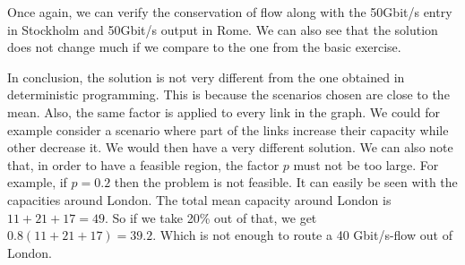 Once again, we can verify the conservation of flow along with the 50Gbit/s entry in Stockholm and 50Gbit/s output in Rome. We can also see that the solution does not change much if we compare to the one from the basic exercise. 

In conclusion, the solution is not very different from the one obtained in deterministic programming. This is because the scenarios chosen are close to the mean. Also, the same factor is applied to every link in the graph. We could for example consider a scenario where part of the links increase their capacity while other decrease it. We would then have a very different solution. We can also note that, in order to have a feasible region, the factor $p$ must not be too large. For example, if $p=0.2$ then the problem is not feasible. It can easily be seen with the capacities around London. The total mean capacity around London is $11+21+17 = 49$. So if we take 20\% out of that, we get $0.8(11+21+17) = 39.2$. Which is not enough to route a 40 Gbit/s-flow out of London.